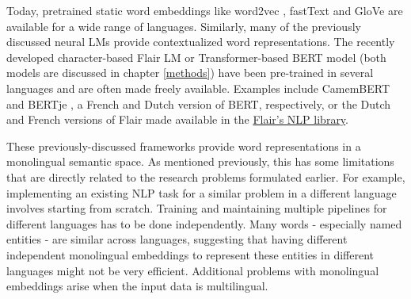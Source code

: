 \documentclass[12pt,a4paper,]{book}
\begin{document}
Today, pretrained static word embeddings like word2vec \citep{mikolov2013}, fastText \citep{bojanowski2017} and GloVe \citep{pennington2014} are available for a wide range of languages. Similarly, many of the previously discussed neural LMs provide contextualized word representations. The recently developed character-based Flair LM \citep{akbik2018} or Transformer-based BERT model \citep{devlin2019} (both models are discussed in chapter \ref{methods}) have been pre-trained in several languages and are often made freely available. Examples include CamemBERT \citep{martin2019} and BERTje \citep{devries2019}, a French and Dutch version of BERT, respectively, or the Dutch and French versions of Flair made available in the \href{https://github.com/flairNLP/flair/blob/master/resources/docs/embeddings/FLAIR_EMBEDDINGS.md}{Flair's NLP library}.

These previously-discussed frameworks provide word representations in a monolingual semantic space. As mentioned previously, this has some limitations that are directly related to the research problems formulated earlier. For example, implementing an existing NLP task for a similar problem in a different language involves starting from scratch. Training and maintaining multiple pipelines for different languages has to be done independently. Many words - especially named entities - are similar across languages, suggesting that having different independent monolingual embeddings to represent these entities in different languages might not be very efficient. Additional problems with monolingual embeddings arise when the input data is multilingual.
\end{document}
